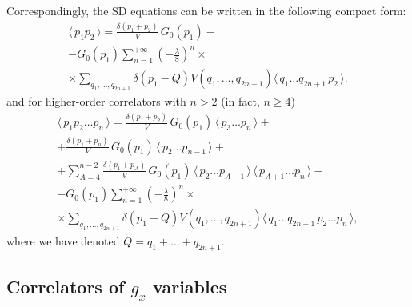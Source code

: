\documentclass[12pt]{article}
\newcommand{\lr}[1]{ \left( #1 \right) }
\newcommand{\vev}[1]{ \langle \, #1 \, \rangle }
\begin{document}
Correspondingly, the SD equations can be written in the following compact form:
\begin{eqnarray}
\label{sd_eqs_G2_mom_vertex}
 \vev{p_1 p_2} = \frac{\delta\lr{p_1 + p_2}}{V} \, G_0\lr{p_1}
 - \nonumber \\ -
 G_0\lr{p_1} \sum\limits_{n=1}^{+\infty}
 \lr{-\frac{\lambda}{8}}^n
 \times \nonumber \\ \times
 \sum\limits_{q_1, \ldots, q_{2 n + 1}}
 \delta\lr{p_1 - Q}
 V\lr{q_1, \ldots, q_{2 n + 1}}
 \vev{q_1 \ldots q_{2 n + 1} \, p_2} .
\end{eqnarray}
and for higher-order correlators with $n > 2$ (in fact, $n \geq 4$)
\begin{eqnarray}
\label{sd_eqs_Gn_mom}
 \vev{p_1 p_2 \ldots p_n}
 =
 \frac{\delta\lr{p_1 + p_2}}{V} \, G_0\lr{p_1} \, \vev{p_3 \ldots p_n}
 + \nonumber \\ +
 \frac{\delta\lr{p_1 + p_n}}{V} \, G_0\lr{p_1} \, \vev{p_2 \ldots p_{n-1}}
 + \nonumber \\ +
 \sum\limits_{A=4}^{n-2}
 \frac{\delta\lr{p_1 + p_A}}{V} \, G_0\lr{p_1} \,
 \vev{p_2 \ldots p_{A-1}} \, \vev{p_{A+1} \ldots p_n}
 - \nonumber \\ -
 G_0\lr{p_1} \sum\limits_{n=1}^{+\infty}
 \lr{-\frac{\lambda}{8}}^n
 \times \nonumber \\ \times
 \sum\limits_{q_1, \ldots, q_{2 n + 1}}
 \delta\lr{p_1 - Q}
 V\lr{q_1, \ldots, q_{2 n + 1}}
 \vev{q_1 \ldots q_{2 n + 1} \, p_2  \ldots p_n} ,
\end{eqnarray}
where we have denoted $Q = q_1 + \ldots + q_{2 n + 1}$.

\subsection{Correlators of $g_x$ variables}
\label{subsec:gx_correlators}
\end{document}
